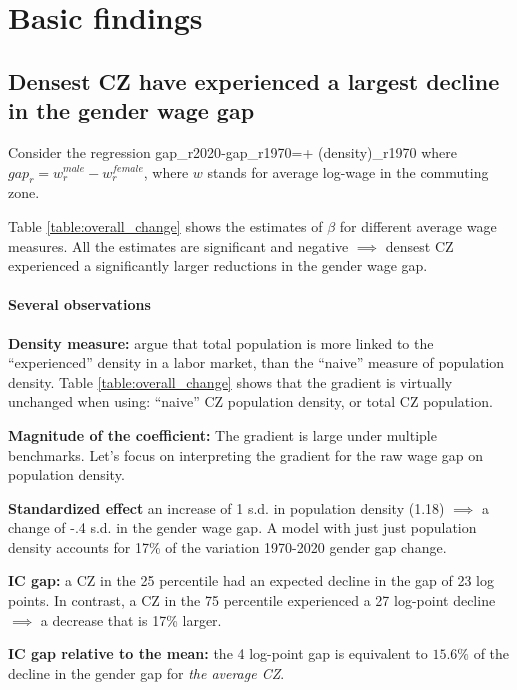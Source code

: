 \section{Basic findings}
\subsection{Densest CZ have experienced a largest decline in the gender wage gap}
Consider the regression
\beqns
	gap_{r2020}-gap_{r1970}=\alpha + \beta\ln(density)_{r1970}
\eeqns
where $gap_r=w_r^{male}-w_r^{female}$, where $w$ stands for average log-wage in the commuting zone.


Table \ref{table:overall_change} shows the estimates of $\beta$ for different average wage measures. All the estimates are significant and negative $\implies$ densest CZ experienced a significantly larger reductions in the gender wage gap. 

\paragraph{Several observations}
\bitem 
	\item \textbf{Density measure:} \cite{Duranton2020} argue that total population is more linked to the ``experienced'' density in a labor market, than the ``naive'' measure of population density. Table \ref{table:overall_change} shows that the gradient is virtually unchanged when using: ``naive'' CZ population density, or total CZ population.
	\item \textbf{Magnitude of the coefficient:} The gradient is large under multiple benchmarks. Let's focus on interpreting the gradient for the raw wage gap on population density.
	\bitem 
		\item \textbf{Standardized effect} an increase of 1 s.d. in population density (1.18) $\implies$ a change of -.4 s.d.  in the gender wage gap.  A model with just just population density accounts for 17\% of the variation 1970-2020 gender gap change.
		\item \textbf{IC gap:} a CZ in the 25 percentile had an expected decline in the gap of 23 log points. In contrast, a CZ in the 75 percentile experienced a 27 log-point decline $\implies$ a decrease that is 17\% larger.  
		\item \textbf{IC gap relative to the mean:} the 4 log-point gap is equivalent to $15.6\%$ of the decline in the gender gap for \textit{the average CZ}.
	\eitem 	
\eitem 




